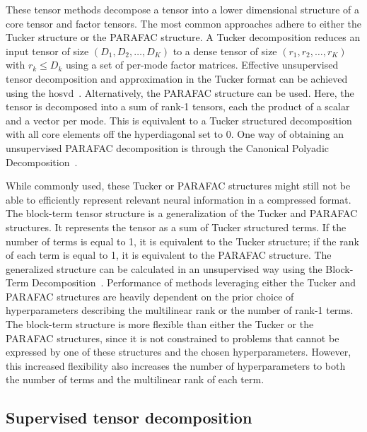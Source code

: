 These tensor methods decompose a tensor into a lower dimensional structure of a
core tensor and factor tensors.
The most common approaches adhere to either the Tucker structure or the PARAFAC
structure.
A Tucker decomposition reduces an input tensor of size $(D_1,D_2,\ldots,D_K)$ to
a dense tensor of size $(r_1,r_2,\ldots,r_K)$ with $r_k \leq D_k$ using a
set of per-mode factor matrices.
Effective unsupervised tensor decomposition and approximation in the Tucker format can be achieved
using the \ac{hosvd}~\cite{DeLathauwer2000,SoleCasals2018}.
Alternatively, the PARAFAC structure can be used.
Here, the tensor is decomposed into a sum of rank-1 tensors, each the product
of a scalar and a vector per mode.
This is equivalent to a Tucker structured decomposition with all core elements
off the hyperdiagonal set to 0.
One way of obtaining an unsupervised PARAFAC decomposition is through the Canonical Polyadic
Decomposition~\cite{Hitchcock1927,Nazarpour2006}.

While commonly used, these Tucker or PARAFAC structures might still not be able to
efficiently represent relevant neural information in a compressed format.
The block-term tensor structure is a generalization of the Tucker and
PARAFAC structures.
It represents the tensor as a sum of Tucker structured terms.
If the number of terms is equal to 1, it is equivalent to the Tucker structure; if the rank of each term is equal to 1, it is equivalent to the PARAFAC
structure.
The generalized structure can be calculated in an unsupervised way using
the Block-Term Decomposition~\cite{DeLathauwer2008,DeLathauwer2008a,DeLathauwer2008b,Rontogiannis2021}.
Performance of methods leveraging either the Tucker and PARAFAC structures are
heavily dependent on the prior choice of hyperparameters describing
the multilinear rank or the number of rank-1 terms.
The block-term structure is more flexible than either the Tucker or the PARAFAC
structures, since it is not constrained to problems that cannot be expressed by
one of these structures and the chosen hyperparameters.
However, this increased flexibility also increases the number of
hyperparameters to both the number of terms and the multilinear rank of each term.

\subsection{Supervised tensor decomposition}

